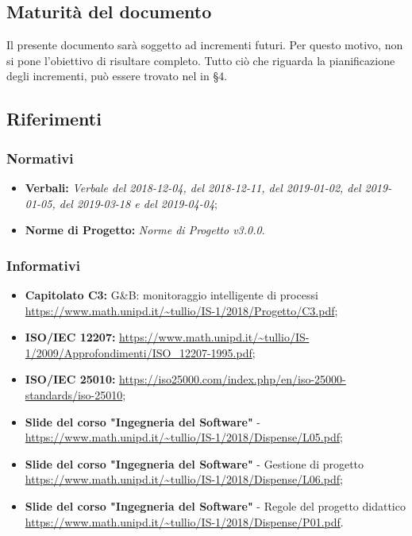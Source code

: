 \subsection{Maturità del documento}
Il presente documento sarà soggetto ad incrementi futuri. Per questo motivo, non si pone l'obiettivo di risultare completo.
Tutto ciò che riguarda la pianificazione degli incrementi, può essere trovato nel \emph{} in §4.  
\subsection{Riferimenti}

\subsubsection{Normativi}
\begin{itemize}
	\item \textbf{Verbali:} \emph{Verbale del 2018-12-04, del 2018-12-11, del 2019-01-02, del 2019-01-05, del 2019-03-18 e del 2019-04-04};
	\item \textbf{Norme di Progetto:} \emph{Norme di Progetto v3.0.0}.
\end{itemize}
\subsubsection{Informativi}
\begin{itemize}	
	\item \textbf{Capitolato C3:} G\&B: monitoraggio intelligente di processi 
 \\ \url{https://www.math.unipd.it/~tullio/IS-1/2018/Progetto/C3.pdf};
 	\item \textbf{ISO/IEC 12207:} \url{https://www.math.unipd.it/~tullio/IS-1/2009/Approfondimenti/ISO_12207-1995.pdf};
 	\item \textbf{ISO/IEC 25010:} \url{https://iso25000.com/index.php/en/iso-25000-standards/iso-25010};
 	\item \textbf{Slide del corso "Ingegneria del Software"} - 
 \\ \url{https://www.math.unipd.it/~tullio/IS-1/2018/Dispense/L05.pdf};
	\item \textbf{Slide del corso "Ingegneria del Software"} - Gestione di progetto
 \\ \url{https://www.math.unipd.it/~tullio/IS-1/2018/Dispense/L06.pdf};
 	\item \textbf{Slide del corso "Ingegneria del Software"} - Regole del progetto didattico
 \\ \url{https://www.math.unipd.it/~tullio/IS-1/2018/Dispense/P01.pdf}.
 
\end{itemize}

